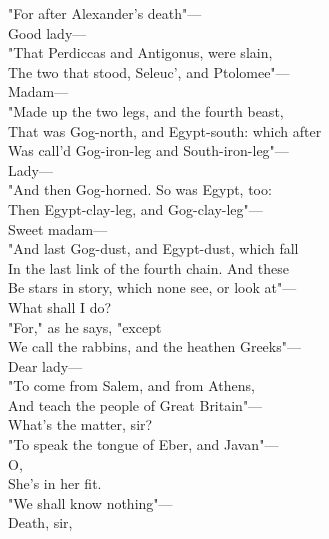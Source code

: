 \documentclass[a4paper,oneside]{memoir}
\begin{document}
\begin{drama*}
\dolspeaks "For after Alexander's death"---\\
\mammonspeaks {} Good lady---\\
\dolspeaks "That Perdiccas and Antigonus, were slain,\\
The two that stood, Seleuc', and Ptolomee"---\\
\mammonspeaks Madam---\\
\dolspeaks {} "Made up the two legs, and the fourth beast,\\
That was Gog-north, and Egypt-south: which after\\
Was call'd Gog-iron-leg and South-iron-leg"---\\
\mammonspeaks Lady---\\
\dolspeaks {} "And then Gog-horned. So was Egypt, too:\\
Then Egypt-clay-leg, and Gog-clay-leg"---\\
\mammonspeaks {} Sweet madam---\\
\dolspeaks "And last Gog-dust, and Egypt-dust, which fall\\
In the last link of the fourth chain. And these\\
Be stars in story, which none see, or look at"---\\
\mammonspeaks What shall I do?\\
\dolspeaks {} "For," as he says, "except\\
We call the rabbins, and the heathen Greeks"---\\
\mammonspeaks Dear lady---\\
\dolspeaks {} "To come from Salem, and from Athens,\\
And teach the people of Great Britain"---\\
\facespeaks {} What's the matter, sir?\\
\dolspeaks "To speak the tongue of Eber, and Javan"---\\
\mammonspeaks O,\\
She's in her fit.\\
\dolspeaks {} "We shall know nothing"---\\
\facespeaks {} Death, sir,\\

\end{drama*}
\end{document}
